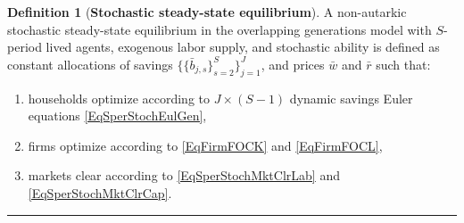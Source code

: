 \documentclass[letterpaper,12pt]{article}
\theoremstyle{definition}
\newtheorem{definition}[theorem]{Definition}
\numberwithin{equation}{section}
\numberwithin{exercise}{section}
\begin{document}
      \begin{definition}[\textbf{Stochastic steady-state equilibrium}]\label{DefSperStochSSEql}
         A non-autarkic stochastic steady-state equilibrium in the overlapping generations model with $S$-period lived agents, exogenous labor supply, and stochastic ability is defined as constant allocations of savings $\bigl\{\{\bar{b}_{j,s}\}_{s=2}^S\bigr\}_{j=1}^J$, and prices $\bar{w}$ and $\bar{r}$ such that:
         \begin{enumerate}
            \item households optimize according to $J\times(S-1)$ dynamic savings Euler equations \eqref{EqSperStochEulGen},
            \item firms optimize according to \eqref{EqFirmFOCK} and \eqref{EqFirmFOCL},
            \item markets clear according to \eqref{EqSperStochMktClrLab} and \eqref{EqSperStochMktClrCap}.
         \end{enumerate}
      \end{definition}
      \vspace{-2mm}
      \hrule
      \vspace{5mm}
\end{document}
